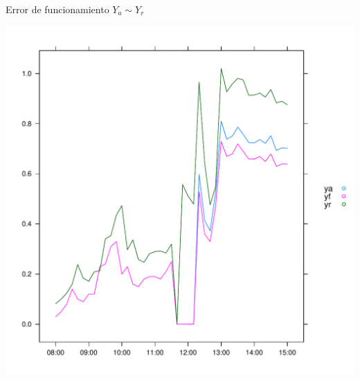 \documentclass[aspectratio=169, usenames,svgnames,dvipsnames]{beamer}
\begin{document}
\begin{frame}[label={sec:orgc9123ac}]{Error de funcionamiento \(Y_a \sim Y_r\)}
\begin{center}
\includegraphics[height=0.95\textheight]{../figs/ErrorMonitorizacion.pdf}
\end{center}
\end{frame}
\end{document}
